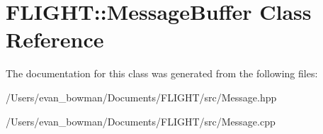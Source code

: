 \hypertarget{class_f_l_i_g_h_t_1_1_message_buffer}{}\section{F\+L\+I\+G\+HT\+:\+:Message\+Buffer Class Reference}
\label{class_f_l_i_g_h_t_1_1_message_buffer}


The documentation for this class was generated from the following files\+:\begin{DoxyCompactItemize}
\item 
/\+Users/evan\+\_\+bowman/\+Documents/\+F\+L\+I\+G\+H\+T/src/Message.\+hpp\item 
/\+Users/evan\+\_\+bowman/\+Documents/\+F\+L\+I\+G\+H\+T/src/Message.\+cpp\end{DoxyCompactItemize}
